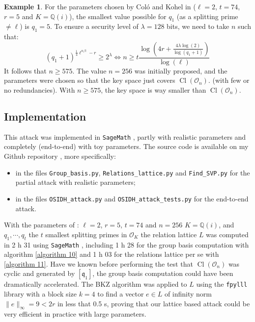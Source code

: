 \documentclass[a4paper,10pt]{report}
\theoremstyle{definition}
\theoremstyle{plain}
\theoremstyle{definition}
\newtheorem{example}[definition]{Example}
\newcommand{\Q}{\mathbb{Q}}
\newcommand{\mO}{\mathcal{O}}
\renewcommand{\(}{\left(}
\renewcommand{\)}{\right)}
\newcommand{\mf}[1]{\mathfrak{#1}}
\DeclareMathOperator{\Cl}{Cl}
\begin{document}
\begin{example}
For the parameters chosen by Col\'{o} and Kohel in \cite[section 6]{OSIDH} ($\ell=2$, $t=74$, $r=5$ and $K=\Q(i)$), the smallest value possible for $q_1$ (as a splitting prime $\neq \ell$) is $q_1=5$. To ensure a security level of $\lambda=128$ bits,  we need to take $n$ such that:
\[(q_1+1)^{\frac{1}{4}\ell^{n/t}-r}\geq 2^\lambda \Longleftrightarrow n\geq t\frac{\log\(4r+\frac{4\lambda\log(2)}{\log(q_1+1)}\)}{\log(\ell)}\]
It follows that $n\geq 575$. The value $n=256$ was initially proposed, and the parameters were chosen so that the key space just covers $\Cl(\mO_n)$. (with few or no redundancies). With $n\geq 575$, the key space is way smaller than $\Cl(\mO_n)$.
\end{example}

\subsection{Implementation}\label{paragraph 17}

This attack was implemented in \verb?SageMath? \cite{sagemath}, partly with realistic parameters and completely (end-to-end) with toy parameters. The source code is available on my Github repository \cite{MyGithub}, more specifically:
\begin{itemize}
\item  in the files \verb?Group_basis.py?, \verb?Relations_lattice.py? and \verb?Find_SVP.py? for the partial attack with realistic parameters;
\item in the files \verb?OSIDH_attack.py? and \verb?OSIDH_attack_tests.py? for the end-to-end attack.
\end{itemize}

With the parameters of \cite[p. 28]{OSIDH}: $\ell=2$, $r=5$, $t=74$ and $n=256$ $K=\Q(i)$,  and $q_1,\cdots, q_t$ the $t$ smallest splitting primes in $\mO_K$ the relation lattice $L$ was computed in 2 h 31 using \verb?SageMath? \cite{sagemath}, including 1 h 28 for the group basis computation with algorithm \ref{algorithm 10} and 1 h 03 for the relations lattice per se with \ref{algorithm 11}. Have we known before performing the test that $\Cl(\mO_n)$ was cyclic and generated by $[\mf{q}_1]$, the group basis computation could have been dramatically accelerated. The BKZ algorithm \cite{BKZ} was applied to $L$ using the \verb?fpylll? library \cite{fpylll} with a block size $k=4$ to find a vector $e\in L$ of infinity norm $\|e\|_\infty=9<2r$ in less that 0.5 s, proving that our lattice based attack could be very efficient in practice with large parameters.
\end{document}
